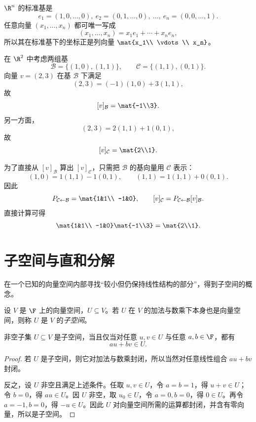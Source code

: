 \begin{example}[标准基与坐标]
$\R^n$ 的标准基是
\[
e_1=(1,0,\dots,0),\ e_2=(0,1,\dots,0),\ \dots,\ e_n=(0,0,\dots,1).
\]
任意向量 $(x_1,\dots,x_n)$ 都可唯一写成
\[
(x_1,\dots,x_n)=x_1e_1+\cdots+x_ne_n,
\]
所以其在标准基下的坐标正是列向量 $\mat{x_1\\ \vdots \\ x_n}$。
\end{example}

\begin{example}[换基计算]
在 $\R^2$ 中考虑两组基
\[
\mathcal B=\{(1,0),(1,1)\},\qquad \mathcal C=\{(1,1),(0,1)\}.
\]
向量 $v=(2,3)$ 在基 $\mathcal B$ 下满足
\[
(2,3)=(-1)(1,0)+3(1,1),
\]
故
\[
[v]_{\mathcal B}=\mat{-1\\3}.
\]
另一方面，
\[
(2,3)=2(1,1)+1(0,1),
\]
故
\[
[v]_{\mathcal C}=\mat{2\\1}.
\]

为了直接从 $[v]_{\mathcal B}$ 算出 $[v]_{\mathcal C}$，只需把 $\mathcal B$ 的基向量用 $\mathcal C$ 表示：
\[
(1,0)=1(1,1)-1(0,1),\qquad (1,1)=1(1,1)+0(0,1).
\]
因此
\[
P_{\mathcal C\leftarrow \mathcal B}=\mat{1&1\\ -1&0},
\qquad [v]_{\mathcal C}=P_{\mathcal C\leftarrow \mathcal B}[v]_{\mathcal B}.
\]
直接计算可得
\[
\mat{1&1\\ -1&0}\mat{-1\\3}=\mat{2\\1}.
\]
\end{example}

\section{子空间与直和分解}

在一个已知的向量空间内部寻找“较小但仍保持线性结构的部分”，得到子空间的概念。

\begin{definition}
设 $V$ 是 $\F$ 上的向量空间，$U\subseteq V$。若 $U$ 在 $V$ 的加法与数乘下本身也是向量空间，则称 $U$ 是 $V$ 的\emph{子空间}。
\end{definition}

\begin{proposition}[子空间判别法]
非空子集 $U\subseteq V$ 是子空间，当且仅当对任意 $u,v\in U$ 与任意 $a,b\in\F$，都有
\[
au+bv\in U.
\]
\end{proposition}

\begin{proof}
若 $U$ 是子空间，则它对加法与数乘封闭，所以当然对任意线性组合 $au+bv$ 封闭。

反之，设 $U$ 非空且满足上述条件。任取 $u,v\in U$，令 $a=b=1$，得 $u+v\in U$；令 $b=0$，得 $au\in U$。因 $U$ 非空，取 $u_0\in U$，令 $a=0,b=0$，得 $0\in U$。再令 $a=-1,b=0$，得 $-u\in U$。因此 $U$ 对向量空间所需的运算都封闭，并含有零向量，所以是子空间。
\end{proof}

